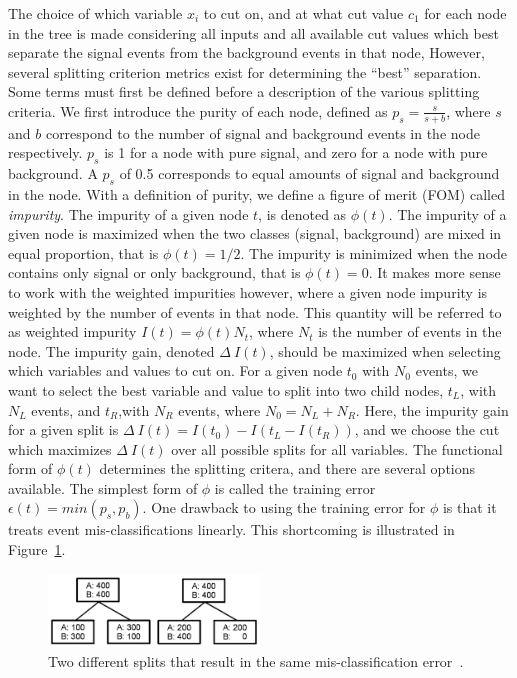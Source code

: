 The choice of which variable $x_{i}$ to cut on, and at what cut value $c_{1}$ for each node
in the tree is made considering all inputs and all available cut values which best separate the signal events from the background events in that node, However, 
several splitting criterion metrics exist for determining the ``best'' separation. 
Some terms must first be defined before a description of the various splitting criteria.
We first introduce the purity of each node, defined as $p_{s}=\frac{s}{s+b}$, where $s$ and $b$ correspond to the number of signal and background
events in the node respectively. $p_{s}$ is 1 for a node with pure signal, and zero for a node with pure background. A $p_{s}$ of 0.5 corresponds to equal amounts
of signal and background in the node.
With a definition of purity, we define a figure of merit (FOM) called \textit{impurity}. The impurity of a given node $t$, is denoted as $\phi(t)$.
The impurity of a given node is maximized when the two classes (signal, background) are mixed in equal proportion, that is $\phi(t) = 1/2$.
The impurity is minimized when the node contains only signal or only background, that is $\phi(t) = 0$.
It makes more sense to work with the weighted impurities however, where a given node impurity is weighted by the number of events in that node. This quantity
will be referred to as weighted impurity $I(t) = \phi(t)N_{t}$, where $N_{t}$ is the number of events in the node. 
The impurity gain, denoted $\Delta~I(t)$, should be maximized when selecting which variables and values to cut on. For a given node $t_{0}$ with $N_{0}$ events, we want to
select the best variable and value to split into two child nodes, $t_{L}$, with $N_{L}$ events, and $t_{R}$,with $N_{R}$ events, where $N_{0} = N_{L} + N_{R}$. Here, the
impurity gain for a given split is $\Delta~I(t) = I(t_{0}) - I(t_{L} - I(t_{R}))$, and we choose the cut which maximizes $\Delta~I(t)$ over all possible splits for all variables.
The functional form of $\phi(t)$ determines the splitting critera, and there are several options available.
The simplest form of $\phi$ is called the training error $\epsilon(t) = min(p_{s},p_{b})$.
One drawback to using the training error for $\phi$ is that it treats event mis-classifications linearly. This shortcoming is illustrated in Figure~\ref{fig:tree_split}.

\begin{figure}[hbtp]
 \begin{center}
   \includegraphics[width=0.5\textwidth]{ap2_figs/tree_split.pdf}
   \caption[Two splits with the same error rate.]{Two different splits that result in the same mis-classification error~\cite{illya}.}
   \label{fig:tree_split}
 \end{center}
\end{figure}

